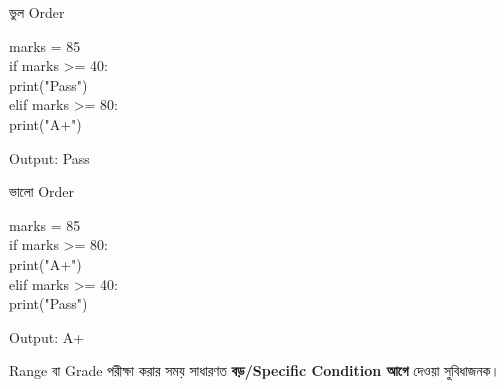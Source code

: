 \noindent
\begin{minipage}[t]{0.49\linewidth}

\begin{sideexamplebox}{ভুল Order}

\begin{sidecodebox}
\begin{english}
\ttfamily
marks = 85\\
if marks >= 40:\\
\hspace*{4mm}print("Pass")\\
elif marks >= 80:\\
\hspace*{4mm}print("A+")
\end{english}
\end{sidecodebox}

Output:
\textenglish{\ttfamily Pass}

\end{sideexamplebox}

\end{minipage}
\hfill
\begin{minipage}[t]{0.49\linewidth}

\begin{sideexamplebox}{ভালো Order}

\begin{sidecodebox}
\begin{english}
\ttfamily
marks = 85\\
if marks >= 80:\\
\hspace*{4mm}print("A+")\\
elif marks >= 40:\\
\hspace*{4mm}print("Pass")
\end{english}
\end{sidecodebox}

Output:
\textenglish{\ttfamily A+}

\end{sideexamplebox}

\end{minipage}

\begin{rememberbox}

Range বা Grade পরীক্ষা করার সময় সাধারণত
\textbf{বড়/Specific Condition আগে}
দেওয়া সুবিধাজনক।

\end{rememberbox}


